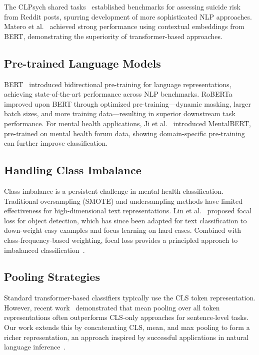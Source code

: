 \documentclass[conference, 10pt]{IEEEtran}
\begin{document}
The CLPsych shared tasks~\cite{zirikly2019clpsych} established benchmarks for assessing suicide risk from Reddit posts, spurring development of more sophisticated NLP approaches. Matero et al.~\cite{matero2019suicide} achieved strong performance using contextual embeddings from BERT, demonstrating the superiority of transformer-based approaches.

\subsection{Pre-trained Language Models}

BERT~\cite{devlin2019bert} introduced bidirectional pre-training for language representations, achieving state-of-the-art performance across NLP benchmarks. RoBERTa~\cite{liu2019roberta} improved upon BERT through optimized pre-training—dynamic masking, larger batch sizes, and more training data—resulting in superior downstream task performance. For mental health applications, Ji et al.~\cite{ji2022mentalbert} introduced MentalBERT, pre-trained on mental health forum data, showing domain-specific pre-training can further improve classification.

\subsection{Handling Class Imbalance}

Class imbalance is a persistent challenge in mental health classification. Traditional oversampling (SMOTE) and undersampling methods have limited effectiveness for high-dimensional text representations. Lin et al.~\cite{lin2017focal} proposed focal loss for object detection, which has since been adapted for text classification to down-weight easy examples and focus learning on hard cases. Combined with class-frequency-based weighting, focal loss provides a principled approach to imbalanced classification~\cite{cui2019class}.

\subsection{Pooling Strategies}

Standard transformer-based classifiers typically use the CLS token representation. However, recent work~\cite{reimers2019sentencebert} demonstrated that mean pooling over all token representations often outperforms CLS-only approaches for sentence-level tasks. Our work extends this by concatenating CLS, mean, and max pooling to form a richer representation, an approach inspired by successful applications in natural language inference~\cite{conneau2017supervised}.
\end{document}
